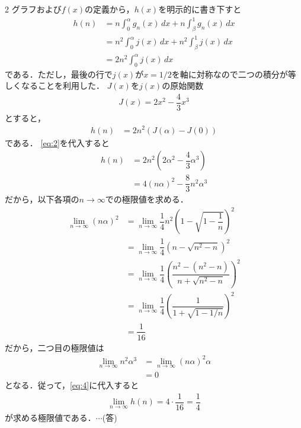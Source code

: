 \documentclass[../../main.tex]{subfiles}
\begin{document}
\begin{multicols}{2}
  グラフおよび$f(x)$の定義から，$h(x)$を明示的に書き下すと
  \begin{align}
    h(n)
    & = n \int_0^\alpha g_n(x) \, dx + n \int_\beta^1 g_n(x) \, dx \\
    & = n^2 \int_0^\alpha j(x) \, dx + n^2 \int_\beta^1 j(x) \, dx \\
    & = 2n^2 \int_0^\alpha j(x) \, dx
  \end{align}
  である．ただし，最後の行で$j(x)$が$x=1/2$を軸に対称なので二つの積分が等しくなることを利用した．
  $J(x)$を$j(x)$の原始関数
  \begin{align}
    J(x) = 2x^2 - \dfrac{4}{3}x^3 \label{eq:2}
  \end{align}
  とすると，
  \begin{align}
    h(n)
    & = 2n^2\left(J(\alpha) - J(0) \right)      \label{eq:3}
  \end{align}
  である．
  \cref{eq:2}を代入すると
  \begin{align}
    h(n)
    & = 2n^2\left(2\alpha^2 - \dfrac{4}{3}\alpha^3\right)          \\
    & = 4(n\alpha)^2 - \dfrac{8}{3}n^2\alpha^3 \label{eq:4}
  \end{align}
  だから，以下各項の$n\to\infty$での極限値を求める．
  \begin{align}
    \lim_{n\to\infty}(n\alpha)^2
    & = \lim_{n\to\infty} \dfrac{1}{4}n^2\left(1-\sqrt{1-\dfrac{1}{n}}\right)^2          \\
    & = \lim_{n\to\infty} \dfrac{1}{4}\left(n-\sqrt{n^2-n}\right)^2                     \\
    & = \lim_{n\to\infty} \dfrac{1}{4}\left(\dfrac{n^2-(n^2-n)}{n+\sqrt{n^2-n}}\right)^2 \\
    & = \lim_{n\to\infty} \dfrac{1}{4}\left(\dfrac{1}{1+\sqrt{1-1/n}} \right)^2          \\
    & = \dfrac{1}{16}
  \end{align}
  だから，二つ目の極限値は
  \begin{align}
    \lim_{n\to\infty}n^2\alpha^3
    & = \lim_{n\to\infty}(n\alpha)^2\alpha \\
    & = 0
  \end{align}
  となる．従って，\cref{eq:4}に代入すると
  \begin{align}
    \lim_{n\to\infty}h(n) = 4\cdot\dfrac{1}{16} = \dfrac{1}{4}
  \end{align}
  が求める極限値である．$\cdots$(答)


\end{multicols}
\end{document}
